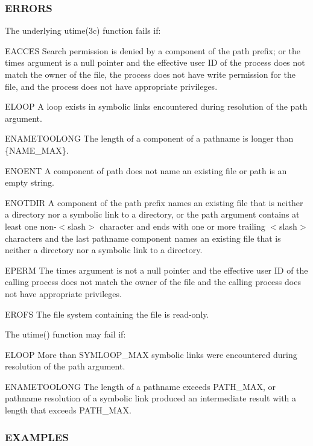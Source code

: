 \subsubsection*{E\+R\+R\+O\+RS}

The underlying utime(3c) function fails if\+:

E\+A\+C\+C\+ES Search permission is denied by a component of the path prefix; or the times argument is a null pointer and the effective user ID of the process does not match the owner of the file, the process does not have write permission for the file, and the process does not have appropriate privileges.

E\+L\+O\+OP A loop exists in symbolic links encountered during resolution of the path argument.

E\+N\+A\+M\+E\+T\+O\+O\+L\+O\+NG The length of a component of a pathname is longer than \{N\+A\+M\+E\+\_\+\+M\+AX\}.

E\+N\+O\+E\+NT A component of path does not name an existing file or path is an empty string.

E\+N\+O\+T\+D\+IR A component of the path prefix names an existing file that is neither a directory nor a symbolic link to a directory, or the path argument contains at least one non-\/$<$slash$>$ character and ends with one or more trailing $<$slash$>$ characters and the last pathname component names an existing file that is neither a directory nor a symbolic link to a directory.

E\+P\+E\+RM The times argument is not a null pointer and the effective user ID of the calling process does not match the owner of the file and the calling process does not have appropriate privileges.

E\+R\+O\+FS The file system containing the file is read-\/only.

The utime() function may fail if\+: \begin{DoxyVerb} ELOOP  More than {SYMLOOP_MAX} symbolic links were encountered
        during resolution of the path argument.

 ENAMETOOLONG  The length of a pathname exceeds {PATH_MAX}, or
               pathname resolution of a symbolic link produced
               an intermediate result with a length that exceeds
               {PATH_MAX}.
\end{DoxyVerb}


\subsubsection*{E\+X\+A\+M\+P\+L\+ES}

